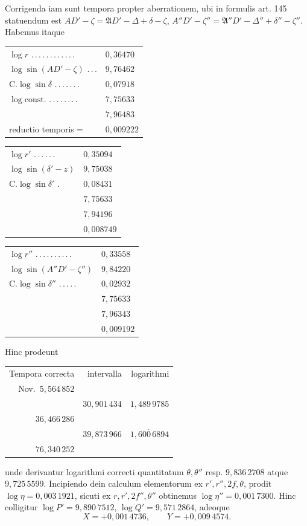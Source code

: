 Corrigenda iam sunt tempora propter aberrationem, ubi in formulis art. 145 statuendum est $AD'-\zeta=\mathfrak AD'-\Delta+\delta-\zeta$, $A''D'-\zeta''=\mathfrak A''D'-\Delta''+\delta''-\zeta''$. Habemus itaque
\begin{center}\begin{tabular}{ll}
$\log r$ .\,.\,.\,.\,.\,.\,.\,.\,.\,.\,.\,. & $0{,}36470$\\
$\log\sin(AD'-\zeta)$ .\,.\,. & $9{,}76462$\\
$\mathrm C.\log\sin\delta$ .\,.\,.\,.\,.\,.\,. & $0{,}07918$\\
$\log\mathrm{const.}$ .\,.\,.\,.\,.\,.\,.\,. & $7{,}75633$\\\hline
& $7{,}96483$\\
reductio temporis$=$ & $0{,}009222$
\end{tabular}\end{center}
\begin{center}\begin{tabular}{ll}
$\log r'$ .\,.\,.\,.\,.\,. & $0{,}35094$\\
$\log\sin(\delta'-z)$ & $9{,}75038$\\
$\mathrm C.\log\sin\delta'$ . & $0{,}08431$\\
& $7{,}75633$\\\hline
& $7{,}94196$\\
& $0{,}008749$
\end{tabular}\end{center}
\begin{center}\begin{tabular}{ll}
$\log r''$ .\,.\,.\,.\,.\,.\,.\,.\,.\,. & $0{,}33558$\\
$\log\sin(A''D'-\zeta'')$ & $9{,}84220$\\
$\mathrm C.\log\sin\delta''$ .\,.\,.\,.\,. & $0{,}02932$\\
& $7{,}75633$\\\hline
& $7{,}96343$\\
& $0{,}009192$
\end{tabular}\end{center}
\noindent Hinc prodeunt
\begin{center}\begin{tabular}{r|r|r}
Tempora correcta & intervalla & logarithmi\\
Nov.\ $5{,}564\,852$ & &\\
& $30{,}901\,434$ & $1{,}489\,9785$\\
$36{,}466\,286$ & &\\
& $39{,}873\,966$ & $1{,}60\overset{.}{0}\,6894$\\
$76{,}340\,252$ & &
\end{tabular}\end{center}
\noindent unde derivantur logarithmi correcti quantitatum $\theta,\theta''$ resp. $9{,}836\,2708$ atque $9{,}725\,5599$. Incipiendo dein calculum elementorum ex $r',r'',2f,\theta$, prodit $\log\eta=0{,}003\,1921$, sicuti ex $r,r',2f'',\theta''$ obtinemus $\log\eta''=0{,}001\,7300$. Hinc colligitur $\log P'=9{,}890\,7512$, $\log Q'=9{,}571\,2864$, adeoque
\[X=+0{,}001\,4736,\qquad Y=+0{,}009\,4574.\]

